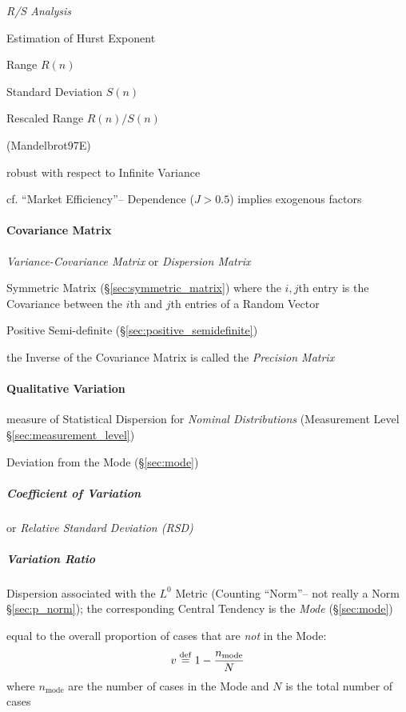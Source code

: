 \emph{R/S Analysis}

Estimation of Hurst Exponent

Range $R(n)$

Standard Deviation $S(n)$

Rescaled Range $R(n) / S(n)$

(Mandelbrot97E)

robust with respect to Infinite Variance

cf. ``Market Efficiency''-- Dependence ($J > 0.5$) implies exogenous factors



\paragraph{Covariance Matrix}\label{sec:covariance_matrix}\hfill

\emph{Variance-Covariance Matrix} or \emph{Dispersion Matrix}

Symmetric Matrix (\S\ref{sec:symmetric_matrix}) where the $i,j$th entry is the
Covariance between the $i$th and $j$th entries of a Random Vector

Positive Semi-definite (\S\ref{sec:positive_semidefinite})

the Inverse of the Covariance Matrix is called the \emph{Precision Matrix}



\paragraph{Qualitative Variation}\label{sec:qualitative_variation}\hfill

measure of Statistical Dispersion for \emph{Nominal Distributions}
(Measurement Level \S\ref{sec:measurement_level})

Deviation from the Mode (\S\ref{sec:mode})



\subparagraph{Coefficient of Variation}\label{sec:variation_coefficient}\hfill

or \emph{Relative Standard Deviation (RSD)}



\subparagraph{Variation Ratio}\label{sec:variation_ratio}\hfill

Dispersion associated with the $L^0$ Metric (Counting ``Norm''-- not really a
Norm \S\ref{sec:p_norm}); the corresponding Central Tendency is the \emph{Mode}
(\S\ref{sec:mode})

equal to the overall proportion of cases that are \emph{not} in the Mode:
\[
  v \stackrel{\mathrm{def}}= 1 - \frac{n_{\text{mode}}}{N}
\]
where $n_{\text{mode}}$ are the number of cases in the Mode and $N$ is the total
number of cases




